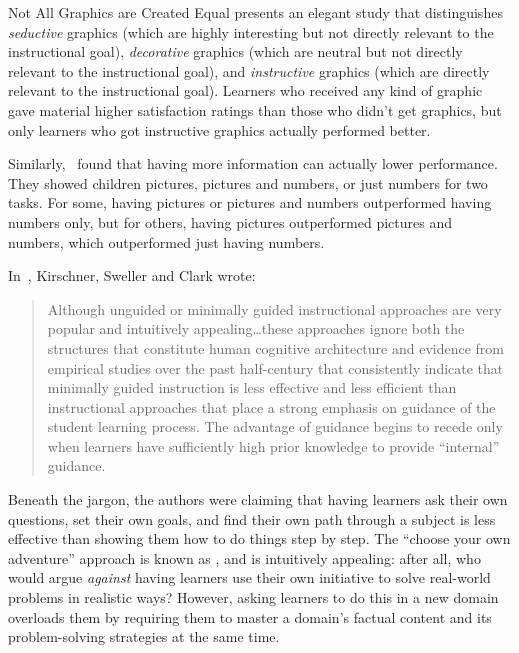 \begin{aside}{Not All Graphics are Created Equal}
  \cite{Sung2012} presents an elegant study that distinguishes \emph{seductive} graphics
  (which are highly interesting but not directly relevant to the instructional goal),
  \emph{decorative} graphics
  (which are neutral but not directly relevant to the instructional goal),
  and \emph{instructive} graphics
  (which are directly relevant to the instructional goal).
  Learners who received any kind of graphic gave material higher satisfaction ratings
  than those who didn't get graphics,
  but only learners who got instructive graphics actually performed better.

  Similarly,~\cite{Stam2013,Stam2014} found that
  having more information can actually lower performance.
  They showed children pictures, pictures and numbers, or just numbers for two tasks.
  For some,
  having pictures or pictures and numbers outperformed having numbers only,
  but for others,
  having pictures outperformed pictures and numbers,
  which outperformed just having numbers.
\end{aside}


In~\cite{Kirs2006}, Kirschner, Sweller and Clark wrote:

\begin{quote}

  Although unguided or minimally guided instructional approaches
  are very popular and intuitively appealing{\ldots}these approaches ignore
  both the structures that constitute human cognitive architecture
  and evidence from empirical studies over the past half-century
  that consistently indicate that minimally guided instruction is less effective and less efficient
  than instructional approaches that place a strong emphasis on guidance of the student learning process.
  The advantage of guidance begins to recede
  only when learners have sufficiently high prior knowledge to provide ``internal'' guidance.

\end{quote}

Beneath the jargon,
the authors were claiming that having learners ask their own questions,
set their own goals,
and find their own path through a subject
is less effective than showing them how to do things step by step.
The ``choose your own adventure'' approach is known as ,
and is intuitively appealing:
after all,
who would argue \emph{against} having learners use their own initiative
to solve real-world problems in realistic ways?
However,
asking learners to do this in a new domain overloads them
by requiring them to master a domain's factual content
and its problem-solving strategies
at the same time.

